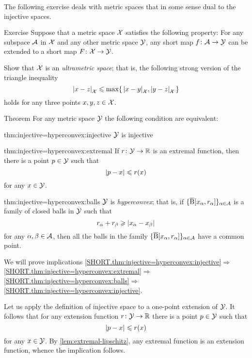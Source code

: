 The following exercise deals with metric spaces that in some sense dual to the injective spaces. 

\begin{thm}{Exercise}\label{ex:ultrametric}
Suppose that a metric space $\mathcal{X}$ satisfies the following property:
For any subspace $\mathcal{A}$ in $\mathcal{X}$ and any other metric space $\mathcal{Y}$, any short map $f\colon\mathcal{A}\to \mathcal{Y}$ can be extended to a short map $F\colon\mathcal{X}\to \mathcal{Y}$.

Show that $\mathcal{X}$ is an \emph{ultrametric space};
that is, the following strong version of the triangle inequality
\[\dist{x}{z}{\spc{X}}
\le
\max\{\,\dist{x}{y}{\spc{X}},\dist{y}{z}{\spc{X}}\,\}\]
holds for any three points $x,y,z\in \mathcal{X}$.
\end{thm}

\begin{thm}{Theorem}\label{thm:injective=hyperconvex}
For any metric space $\mathcal{Y}$ the following condition are equivalent:

\begin{subthm}{thm:injective=hyperconvex:injective}
$\mathcal{Y}$ is injective
\end{subthm}


\begin{subthm}{thm:injective=hyperconvex:extremal}
If $r\colon\mathcal{Y}\to\mathbb{R}$ is an extremal function, then there is a point $p\in \mathcal{Y}$ such that 
\[\dist{p}{x}{}\le r(x)\]
for any $x\in \mathcal{Y}$.
\end{subthm}

\begin{subthm}{thm:injective=hyperconvex:balls}
$\mathcal{Y}$ is \emph{hyperconvex};
that is, if $\{\overline{\mathrm{B}}{}[x_\alpha,r_\alpha]\}_{\alpha\in\mathcal{A}}$ is a family of closed balls in $\mathcal{Y}$ such that 
 \[r_\alpha+r_\beta\ge \dist{x_\alpha}{x_\beta}{}\]
 for any $\alpha,\beta\in \mathcal{A}$, then all the balls in the family $\{\overline{\mathrm{B}}{}[x_\alpha,r_\alpha]\}_{\alpha\in\mathcal{A}}$ have a common point.
\end{subthm}

\end{thm}

 We will prove implications 
\ref{SHORT.thm:injective=hyperconvex:injective}$\Rightarrow$\ref{SHORT.thm:injective=hyperconvex:extremal}$\Rightarrow$\ref{SHORT.thm:injective=hyperconvex:balls}$\Rightarrow$\ref{SHORT.thm:injective=hyperconvex:injective}.

Let us apply the definition of injective space to a one-point extension of $\mathcal{Y}$.
It follows that for any extension function $r\colon\mathcal{Y}\to\mathbb{R}$ there is a point $p\in \mathcal{Y}$ such that 
\[\dist{p}{x}{}\le r(x)\]
for any $x\in \mathcal{Y}$.
By \ref{lem:extremal-lipschitz}, any extremal function is an extension function, whence the implication follows.

